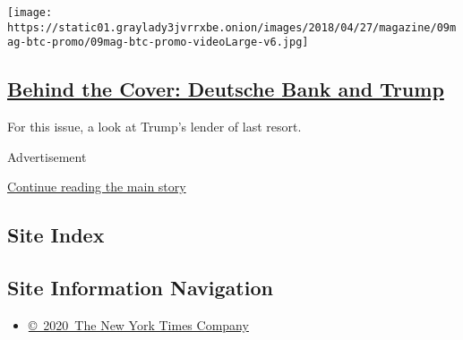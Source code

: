 \begin{enumerate}
  \texttt{[image: https://static01.graylady3jvrrxbe.onion/images/2018/04/27/magazine/09mag-btc-promo/09mag-btc-promo-videoLarge-v6.jpg]}

  \hypertarget{behind-the-cover-deutsche-bank-and-trump}{%
  \subsection{\texorpdfstring{\href{/2020/02/06/magazine/behind-the-cover-deutsche-bank-and-trump.html}{Behind
  the Cover: Deutsche Bank and
  Trump}}{Behind the Cover: Deutsche Bank and Trump}}\label{behind-the-cover-deutsche-bank-and-trump}}

  For this issue, a look at Trump's lender of last resort.
\end{enumerate}

Advertisement

\protect\hyperlink{after-mid1}{Continue reading the main story}

\hypertarget{site-index}{%
\subsection{Site Index}\label{site-index}}

\hypertarget{site-information-navigation}{%
\subsection{Site Information
Navigation}\label{site-information-navigation}}

\begin{itemize}
\tightlist
\item
  \href{https://help.nytimes3xbfgragh.onion/hc/en-us/articles/115014792127-Copyright-notice}{©~2020~The
  New York Times Company}
\end{itemize}

